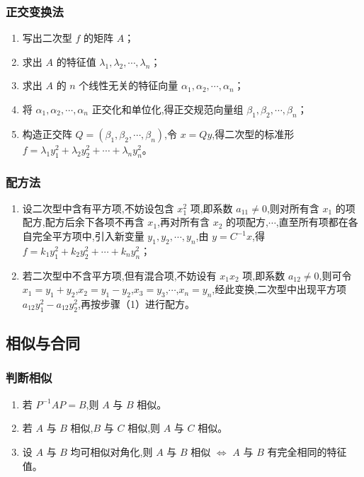 \documentclass[UTF8]{ctexart}
\theoremstyle{remark}
\begin{document}
	\subsubsection{正交变换法}
	\begin{enumerate}
		\item 写出二次型 \(f\) 的矩阵 \(A\)；
		\item 求出 \(A\) 的特征值 \(\lambda_1, \lambda_2, \cdots, \lambda_n\)；
		\item 求出 \(A\) 的 \(n\) 个线性无关的特征向量 \(\alpha_1, \alpha_2, \cdots, \alpha_n\)；
		\item 将 \(\alpha_1, \alpha_2, \cdots, \alpha_n\) 正交化和单位化,得正交规范向量组 \(\beta_1, \beta_2, \cdots, \beta_n\)；
		\item 构造正交阵 \(Q = (\beta_1, \beta_2, \cdots, \beta_n)\),令 \(x = Qy\),得二次型的标准形 \(f = \lambda_1y_1^2 + \lambda_2y_2^2 + \cdots + \lambda_ny_n^2\)。
	\end{enumerate}
	
	\subsubsection{配方法}
	\begin{enumerate}
		\item 设二次型中含有平方项,不妨设包含 \(x_1^2\) 项,即系数 \(a_{11} \neq 0\),则对所有含 \(x_1\) 的项配方,配方后余下各项不再含 \(x_1\),再对所有含 \(x_2\) 的项配方,\(\cdots\),直至所有项都在各自完全平方项中,引入新变量 \(y_1, y_2, \cdots, y_n\),由 \(y = C^{-1}x\),得 \(f = k_1y_1^2 + k_2y_2^2 + \cdots + k_ny_n^2\)；
		\item 若二次型中不含平方项,但有混合项,不妨设有 \(x_1x_2\) 项,即系数 \(a_{12} \neq 0\),则可令 \(x_1 = y_1 + y_2\),\(x_2 = y_1 - y_2\),\(x_3 = y_3\),\(\cdots\),\(x_n = y_n\),经此变换,二次型中出现平方项 \(a_{12}y_1^2 - a_{12}y_2^2\),再按步骤（1）进行配方。
	\end{enumerate}
	
	\subsection{相似与合同}
	\subsubsection{判断相似}
	\begin{enumerate}
		\item 若 \(P^{-1}AP = B\),则 \(A\) 与 \(B\) 相似。
		\item 若 \(A\) 与 \(B\) 相似,\(B\) 与 \(C\) 相似,则 \(A\) 与 \(C\) 相似。
		\item 设 \(A\) 与 \(B\) 均可相似对角化,则 \(A\) 与 \(B\) 相似 \(\Leftrightarrow\) \(A\) 与 \(B\) 有完全相同的特征值。
	\end{enumerate}
\end{document}
